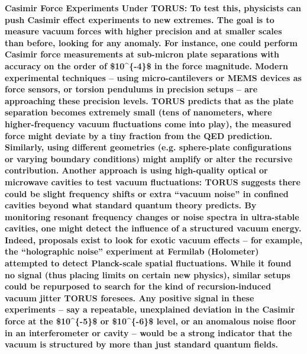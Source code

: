 \documentclass[
]{article}
\begin{document}
\textbf{Casimir Force Experiments Under TORUS: To test this, physicists
can push Casimir effect experiments to new extremes. The goal is to
measure vacuum forces with higher precision and at smaller scales than
before, looking for any anomaly. For instance, one could perform Casimir
force measurements at sub-micron plate separations with accuracy on the
order of \$10\^{}\{-4\}\$ in the force magnitude. Modern experimental
techniques -- using micro-cantilevers or MEMS devices as force sensors,
or torsion pendulums in precision setups -- are approaching these
precision levels. TORUS predicts that as the plate separation becomes
extremely small (tens of nanometers, where higher-frequency vacuum
fluctuations come into play), the measured force might deviate by a tiny
fraction from the QED prediction. Similarly, using different geometries
(e.g. sphere-plate configurations or varying boundary conditions) might
amplify or alter the recursive contribution. Another approach is using
high-quality optical or microwave cavities to test vacuum fluctuations:
TORUS suggests there could be slight frequency shifts or extra ``vacuum
noise'' in confined cavities beyond what standard quantum theory
predicts. By monitoring resonant frequency changes or noise spectra in
ultra-stable cavities, one might detect the influence of a structured
vacuum energy. Indeed, proposals exist to look for exotic vacuum effects
-- for example, the ``holographic noise'' experiment at Fermilab
(Holometer) attempted to detect Planck-scale spatial fluctuations. While
it found no signal (thus placing limits on certain new physics), similar
setups could be repurposed to search for the kind of recursion-induced
vacuum jitter TORUS foresees. Any positive signal in these experiments
-- say a repeatable, unexplained deviation in the Casimir force at the
\$10\^{}\{-5\}\$ or \$10\^{}\{-6\}\$ level, or an anomalous noise floor
in an interferometer or cavity -- would be a strong indicator that the
vacuum is structured by more than just standard quantum fields.}
\end{document}
